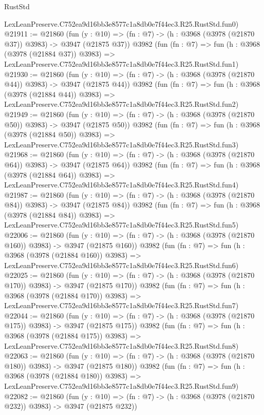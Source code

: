 \begin{lexlean}{RustStd}
\begin{coremodule}
    LexLeanPreserve.C752ea9d16bb3e8577c1a8db0e7f44ec3.R25.RustStd.fun0)
@21911 := @21860
    (fun (y : @10) => (fn : @7) -> (h : @3968 (@3978 (@21870 @37)) @3983) -> @3947 (@21875 @37))
    @3982
    (fun (fn : @7) =>
    fun (h : @3968 (@3978 (@21884 @37)) @3983) =>
    LexLeanPreserve.C752ea9d16bb3e8577c1a8db0e7f44ec3.R25.RustStd.fun1)
@21930 := @21860
    (fun (y : @10) => (fn : @7) -> (h : @3968 (@3978 (@21870 @44)) @3983) -> @3947 (@21875 @44))
    @3982
    (fun (fn : @7) =>
    fun (h : @3968 (@3978 (@21884 @44)) @3983) =>
    LexLeanPreserve.C752ea9d16bb3e8577c1a8db0e7f44ec3.R25.RustStd.fun2)
@21949 := @21860
    (fun (y : @10) => (fn : @7) -> (h : @3968 (@3978 (@21870 @50)) @3983) -> @3947 (@21875 @50))
    @3982
    (fun (fn : @7) =>
    fun (h : @3968 (@3978 (@21884 @50)) @3983) =>
    LexLeanPreserve.C752ea9d16bb3e8577c1a8db0e7f44ec3.R25.RustStd.fun3)
@21968 := @21860
    (fun (y : @10) => (fn : @7) -> (h : @3968 (@3978 (@21870 @64)) @3983) -> @3947 (@21875 @64))
    @3982
    (fun (fn : @7) =>
    fun (h : @3968 (@3978 (@21884 @64)) @3983) =>
    LexLeanPreserve.C752ea9d16bb3e8577c1a8db0e7f44ec3.R25.RustStd.fun4)
@21987 := @21860
    (fun (y : @10) => (fn : @7) -> (h : @3968 (@3978 (@21870 @84)) @3983) -> @3947 (@21875 @84))
    @3982
    (fun (fn : @7) =>
    fun (h : @3968 (@3978 (@21884 @84)) @3983) =>
    LexLeanPreserve.C752ea9d16bb3e8577c1a8db0e7f44ec3.R25.RustStd.fun5)
@22006 := @21860
    (fun (y : @10) => (fn : @7) -> (h : @3968 (@3978 (@21870 @160)) @3983) -> @3947 (@21875 @160))
    @3982
    (fun (fn : @7) =>
    fun (h : @3968 (@3978 (@21884 @160)) @3983) =>
    LexLeanPreserve.C752ea9d16bb3e8577c1a8db0e7f44ec3.R25.RustStd.fun6)
@22025 := @21860
    (fun (y : @10) => (fn : @7) -> (h : @3968 (@3978 (@21870 @170)) @3983) -> @3947 (@21875 @170))
    @3982
    (fun (fn : @7) =>
    fun (h : @3968 (@3978 (@21884 @170)) @3983) =>
    LexLeanPreserve.C752ea9d16bb3e8577c1a8db0e7f44ec3.R25.RustStd.fun7)
@22044 := @21860
    (fun (y : @10) => (fn : @7) -> (h : @3968 (@3978 (@21870 @175)) @3983) -> @3947 (@21875 @175))
    @3982
    (fun (fn : @7) =>
    fun (h : @3968 (@3978 (@21884 @175)) @3983) =>
    LexLeanPreserve.C752ea9d16bb3e8577c1a8db0e7f44ec3.R25.RustStd.fun8)
@22063 := @21860
    (fun (y : @10) => (fn : @7) -> (h : @3968 (@3978 (@21870 @180)) @3983) -> @3947 (@21875 @180))
    @3982
    (fun (fn : @7) =>
    fun (h : @3968 (@3978 (@21884 @180)) @3983) =>
    LexLeanPreserve.C752ea9d16bb3e8577c1a8db0e7f44ec3.R25.RustStd.fun9)
@22082 := @21860
    (fun (y : @10) => (fn : @7) -> (h : @3968 (@3978 (@21870 @232)) @3983) -> @3947 (@21875 @232))

\end{coremodule}
\end{lexlean}
